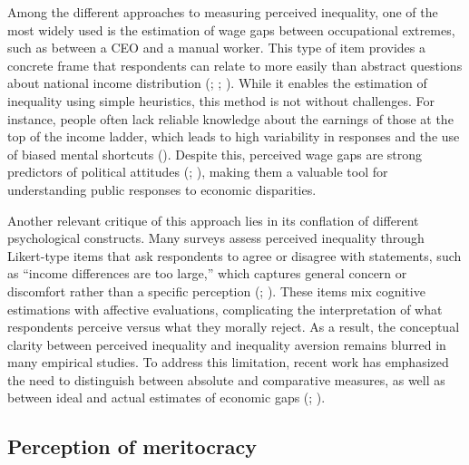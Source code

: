 \documentclass[
  12pt,
]{article}
\begin{document}
Among the different approaches to measuring perceived inequality, one of
the most widely used is the estimation of wage gaps between occupational
extremes, such as between a CEO and a manual worker. This type of item
provides a concrete frame that respondents can relate to more easily
than abstract questions about national income distribution
(;
;
). While it
enables the estimation of inequality using simple heuristics, this
method is not without challenges. For instance, people often lack
reliable knowledge about the earnings of those at the top of the income
ladder, which leads to high variability in responses and the use of
biased mental shortcuts (). Despite this, perceived wage gaps are strong predictors of
political attitudes
(; ),
making them a valuable tool for understanding public responses to
economic disparities.

Another relevant critique of this approach lies in its conflation of
different psychological constructs. Many surveys assess perceived
inequality through Likert-type items that ask respondents to agree or
disagree with statements, such as ``income differences are too large,''
which captures general concern or discomfort rather than a specific
perception (;
). These items mix cognitive estimations with affective
evaluations, complicating the interpretation of what respondents
perceive versus what they morally reject. As a result, the conceptual
clarity between perceived inequality and inequality aversion remains
blurred in many empirical studies. To address this limitation, recent
work has emphasized the need to distinguish between absolute and
comparative measures, as well as between ideal and actual estimates of
economic gaps (;
).

\subsection{Perception of meritocracy}\label{perception-of-meritocracy}
\end{document}
